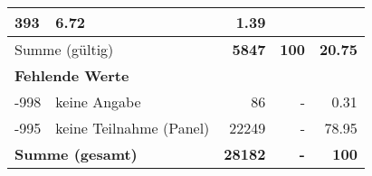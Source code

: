 \begin{longtable}{lXrrr}
       \num{393} &
       \num[round-mode=places,round-precision=2]{6.72} &
         \num[round-mode=places,round-precision=2]{1.39} \\
     \midrule
     \multicolumn{2}{l}{Summe (gültig)} &
       \textbf{\num{5847}} &
     \textbf{\num{100}} &
       \textbf{\num[round-mode=places,round-precision=2]{20.75}} \\
     \multicolumn{5}{l}{\textbf{Fehlende Werte}}\\
       -998 &
       keine Angabe &
         \num{86} &
        - &
         \num[round-mode=places,round-precision=2]{0.31} \\
       -995 &
       keine Teilnahme (Panel) &
         \num{22249} &
        - &
         \num[round-mode=places,round-precision=2]{78.95} \\
     \midrule
     \multicolumn{2}{l}{\textbf{Summe (gesamt)}} &
          \textbf{\num{28182}} &
        \textbf{-} &
        \textbf{\num{100}} \\
     \bottomrule
     \end{longtable}
     

